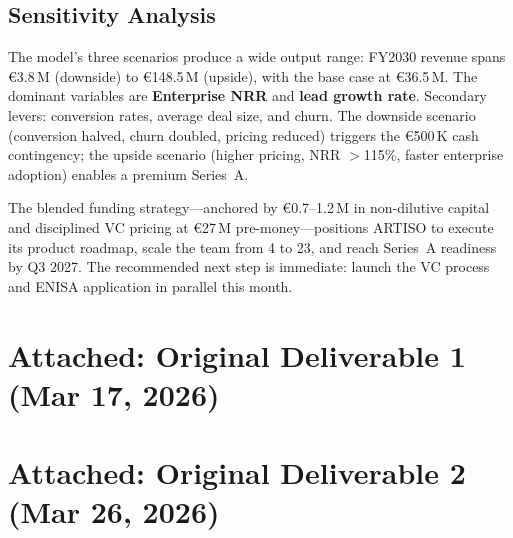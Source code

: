 \documentclass[11pt,a4paper]{article}
\begin{document}
\subsection*{Sensitivity Analysis}

The model's three scenarios produce a wide output range: FY2030 revenue spans \euro{}3.8\,M (downside) to \euro{}148.5\,M (upside), with the base case at \euro{}36.5\,M. The dominant variables are \textbf{Enterprise NRR} and \textbf{lead growth rate}. Secondary levers: conversion rates, average deal size, and churn. The downside scenario (conversion halved, churn doubled, pricing reduced) triggers the \euro{}500\,K cash contingency; the upside scenario (higher pricing, NRR $>$115\%, faster enterprise adoption) enables a premium Series~A.

\vspace{6pt}
The blended funding strategy---anchored by \euro{}0.7--1.2\,M in non-dilutive capital and disciplined VC pricing at \euro{}27\,M pre-money---positions ARTISO to execute its product roadmap, scale the team from 4 to 23, and reach Series~A readiness by Q3 2027. The recommended next step is immediate: launch the VC process and ENISA application in parallel this month.

\newpage
\vspace{4pt}
\noindent{}
\vspace{4pt}

\section*{Attached: Original Deliverable 1 (Mar 17, 2026)}


\section*{Attached: Original Deliverable 2 (Mar 26, 2026)}

\end{document}
